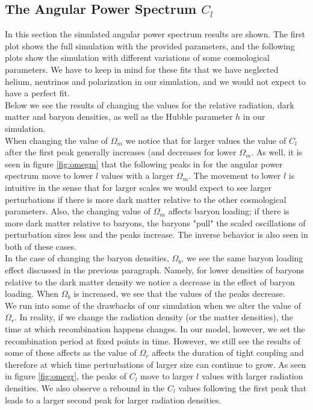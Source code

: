 \documentclass[a4paper]{article}
\begin{document}
\subsection{The Angular Power Spectrum $C_l$}

In this section the simulated angular power spectrum results are shown. The first plot shows the full simulation with the provided parameters, and the following plots show the simulation with different variations of some cosmological parameters. We have to keep in mind for these fits that we have neglected helium, neutrinos and polarization in our simulation, and we would not expect to have a perfect fit.\\

Below we see the results of changing the values for the relative radiation, dark matter and baryon densities, as well as the Hubble parameter $h$ in our simulation.\\

When changing the value of $\Omega_m$ we notice that for larger values the value of $C_l$ after the first peak generally increases (and decreases for lower $\Omega_m$. As well, it is seen in figure \ref{fig:omegm} that the following peaks in for the angular power spectrum move to lower $l$ values with a larger $\Omega_m$. The movement to lower $l$ is intuitive in the sense that for larger scales we would expect to see larger perturbations if there is more dark matter relative to the other cosmological parameters. Also, the changing value of $\Omega_m$ affects baryon loading; if there is more dark matter relative to baryons, the baryons "pull" the scaled oscillations of perturbation sizes less and the peaks increase. The inverse behavior is also seen in both of these cases.\\

In the case of changing the baryon densities, $\Omega_b$, we see the same baryon loading effect discussed in the previous paragraph. Namely, for lower densities of baryons relative to the dark matter density we notice a decrease in the effect of baryon loading. When $\Omega_b$ is increased, we see that the values of the peaks decrease.\\

We run into some of the drawbacks of our simulation when we alter the value of $\Omega_r$. In reality, if we change the radiation density (or the matter densities), the time at which recombination happens changes. In our model, however, we set the recombination period at fixed points in time. However, we still see the results of some of these affects as the value of $\Omega_r$ affects the duration of tight coupling and therefore at which time perturbations of larger size can continue to grow. As seen in figure \ref{fig:omegr}, the peaks of $C_l$ move to larger $l$ values with larger radiation densities. We also observe a rebound in the $C_l$ values following the first peak that leads to a larger second peak for larger radiation densities.\\
\end{document}
